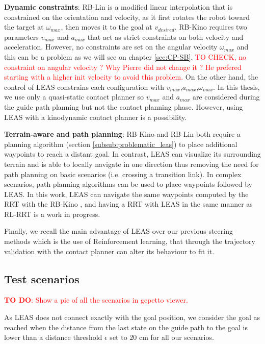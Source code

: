 \noindent \textbf{Dynamic constraints}:
RB-Lin is a modified linear interpolation that is constrained on the orientation and velocity, as it first rotates the robot toward the target at $\omega_{max}$, then moves it to the goal at $v_{desired}$.
RB-Kino requires two parameters $v_{max}$ and $a_{max}$ that act as strict constraints on both velocity and acceleration. However, no constraints are set on the angular velocity $\omega_{max}$ and this can be a problem as we will see on chapter \ref{sec:CP-SB}. \textcolor{red}{TO CHECK, no constraint on angular velocity ? Why Pierre did not change it ? He prefered starting with a higher init velocity to avoid this problem.}
On the other hand, the control of LEAS constrains each configuration with $v_{max}$,$a_{max}$,$\omega_{max}$. 
In this thesis, we use only a quasi-static contact planner so $v_{max}$ and $a_{max}$ are considered during the guide path planning but not the contact planning phase. However, using LEAS with a kinodynamic contact planner is a possibility.

\noindent \textbf{Terrain-aware and path planning}:
RB-Kino and RB-Lin both require a planning algorithm (section \ref{subsub:problematic_leas}) to place additional waypoints to reach a distant goal. In contrast, LEAS can visualize its surrounding terrain and is able to locally navigate in one direction thus removing the need for path planning on basic scenarios (i.e. crossing a transition link). 
In complex scenarios, path planning algorithms can be used to place waypoints followed by LEAS. 
In this work, LEAS can navigate the same waypoints computed by the RRT with the RB-Kino \cite{kinodynamic-sm}, and having a RRT with LEAS in the same manner as RL-RRT \cite{RL_RRT} is a work in progress.

Finally, we recall the main advantage of LEAS over our previous steering methods which is the use of Reinforcement learning, that through the trajectory validation with the contact planner can alter its behaviour to fit it.

\subsection{Test scenarios\label{subsub:leas:test_scenarios}}

\textcolor{red}{\textbf{TO DO}: Show a pic of all the scenarios in gepetto viewer.}

As LEAS does not connect exactly with the goal position, we consider the goal as reached when the distance from the last state on the guide path to the goal is lower than a distance threshold $\epsilon$ set to $20$ cm for all our scenarios.

